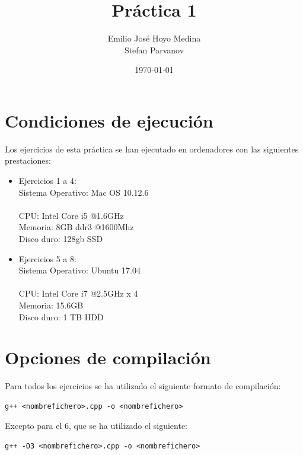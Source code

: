 \documentclass{article}
\begin{document}
\lstset{numbers=left}
      
\title{Práctica 1}
\author{Emilio José Hoyo Medina\\ Stefan Parvanov}
\date{\today}
\maketitle



\clearpage
\section{Condiciones de ejecución}
Los ejercicios de esta práctica se han ejecutado en ordenadores con las siguientes prestaciones:
\begin{itemize}
	\item Ejercicios 1 a 4:\\
	Sistema Operativo: Mac OS 10.12.6 \\ \\
	CPU: Intel Core i5 @1.6GHz	\\
	Memoria: 8GB ddr3 @1600Mhz	\\	
	Disco duro: 128gb SSD		\\
      \item Ejercicios 5 a 8:\\
        Sistema Operativo: Ubuntu 17.04 \\ \\
	CPU: Intel Core i7 @2.5GHz x 4	\\
	Memoria: 15.6GB	                \\	
	Disco duro: 1 TB HDD		\\
      \end{itemize}

      
\section{Opciones de compilación}
Para todos los ejercicios se ha utilizado el siguiente formato de compilación:

\begin{verbatim}
g++ <nombrefichero>.cpp -o <nombrefichero>
\end{verbatim}
Excepto para el 6, que se ha utilizado el siguiente:
\begin{verbatim}
g++ -O3 <nombrefichero>.cpp -o <nombrefichero>
\end{verbatim}
\clearpage
\end{document}
